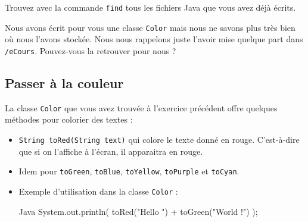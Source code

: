 \documentclass[a4paper,11pt]{article}
\begin{document}
			
		\begin{Exercice}{}
		
			Trouvez avec la commande \verb_find_ tous les fichiers Java que vous avez d\'ej\`a \'ecrits.
			
            		\par
        
			\par\medskip
				
			Nous avons \'ecrit pour vous une classe \verb_Color_ mais nous ne savons plus tr\`es bien o\`u nous l'avons stock\'ee.
			Nous nous rappelons juste l'avoir mise quelque part dans \verb_/eCours_.
			Pouvez-vous la retrouver pour nous ?
			
            		\par
        
				\par\medskip
	\subsection{Passer \`a la couleur}
			La classe \verb_Color_ que vous avez trouv\'ee \`a l'exercice pr\'ec\'edent offre quelques m\'ethodes pour colorier des textes :
			
            		\par
        
			\begin{itemize}
				
				\item \verb_String toRed(String text)_ qui colore le texte donn\'e en rouge.
					C'est-\`a-dire que si on l'affiche \`a l'\'ecran, il apparaitra en rouge.
				
				\item Idem pour \verb_toGreen_, \verb_toBlue_, \verb_toYellow_, \verb_toPurple_
					et \verb_toCyan_.
				
				\item Exemple d'utilisation dans la classe \verb_Color_ :
					\begin{Code}{Java}{
						System.out.println( toRed("Hello ") + toGreen("World !") );}
					\end{Code}
			\end{itemize}
		
		\end{Exercice}
				
\end{document}
